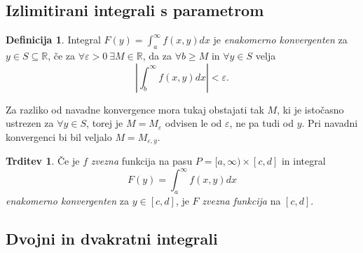 \documentclass[11pt]{article}
\theoremstyle{definition}
\newtheorem{definicija}{Definicija}[section]
\theoremstyle{definition}
\newtheorem{trditev}{Trditev}[section]
\theoremstyle{definition}
\begin{document}

\subsection{Izlimitirani integrali s parametrom}
\vspace{0.5cm}

\begin{definicija}

Integral $F(y) = \int_{a}^{\infty} f(x, y) dx$ je \textit{enakomerno konvergenten} za $y \in S \subseteq \mathbb{R}$, če za $\forall \varepsilon > 0 ~\exists M \in \mathbb{R}$, da za $\forall b \geq M$ in $\forall y \in S$ velja
$$\left| \int_{b}^{\infty} f(x, y) dx \right| < \varepsilon.$$ 

Za razliko od navadne konvergence mora tukaj obstajati tak $M$, ki je istočasno ustrezen za $\forall y \in S$, torej je $M = M_{\varepsilon}$ odvisen le od $\varepsilon$, ne pa tudi od $y$. Pri navadni konvergenci bi bil veljalo $M = M_{\varepsilon,y}$.

\end{definicija}
\vspace{0.5cm}

\begin{trditev}

Če je $f$ \textit{zvezna} funkcija na pasu $P = [a, \infty) \times [c, d]$ in integral
$$F(y) = \int_{a}^{\infty} f(x, y) dx$$
\textit{enakomerno konvergenten} za $y \in [c, d]$, je $F$ \textit{zvezna funkcija} na $[c, d]$.

\end{trditev}
\vspace{0.5cm}


\subsection{Dvojni in dvakratni integrali}
\vspace{0.5cm}
\end{document}
